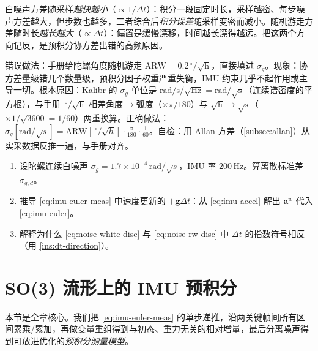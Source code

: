 \begin{insight}\label{ins:dt-direction}
白噪声方差随采样\emph{越快越小}（$\propto1/\Delta t$）：积分一段固定时长，采样越密、每步噪声方差越大，但步数也越多，二者综合后\emph{积分误差}随采样变密而减小。随机游走方差随时长\emph{越长越大}（$\propto\Delta t$）：偏置是缓慢漂移，时间越长漂得越远。把这两个方向记反，是预积分协方差出错的高频原因。
\end{insight}

\begin{pitfall}
错误做法：手册给陀螺角度随机游走 $\mathrm{ARW}=0.2\,^\circ/\sqrt{\mathrm h}$，直接填进 $\sigma_g$。现象：协方差量级错几个数量级，预积分因子权重严重失衡，IMU 约束几乎不起作用或主导一切。根本原因：Kalibr 的 $\sigma_g$ 单位是 $\mathrm{rad}/\mathrm s/\sqrt{\mathrm{Hz}}=\mathrm{rad}/\sqrt{\mathrm s}$（连续谱密度的平方根），与手册 $\,^\circ/\sqrt{\mathrm h}$ 相差角度$\to$弧度（$\times\pi/180$）与 $\sqrt{\mathrm h}\to\sqrt{\mathrm s}$（$\times1/\sqrt{3600}=1/60$）两重换算。正确做法：$\sigma_g[\mathrm{rad}/\sqrt s]=\mathrm{ARW}[\,^\circ/\sqrt h]\cdot\frac{\pi}{180}\cdot\frac{1}{60}$。自检：用 Allan 方差（\cref{subsec:allan}）从实采数据反推一遍，与手册对齐。
\end{pitfall}

\begin{practice}
\begin{enumerate}
  \item 设陀螺连续白噪声 $\sigma_g=1.7\times10^{-4}\,\mathrm{rad}/\sqrt s$，IMU 率 $200\,\mathrm{Hz}$。算离散标准差 $\sigma_{g,d}$。
  \item 推导 \cref{eq:imu-euler-meas} 中速度更新的 $+\mathbf g\Delta t$：从 \cref{eq:imu-accel} 解出 $\mathbf a^w$ 代入 \cref{eq:imu-euler}。
  \item 解释为什么 \cref{eq:noise-white-disc} 与 \cref{eq:noise-rw-disc} 中 $\Delta t$ 的指数符号相反（用 \cref{ins:dt-direction}）。
\end{enumerate}
\end{practice}

\section{SO(3) 流形上的 IMU 预积分}
\label{sec:imu-preint}

本节是全章核心。我们把 \cref{eq:imu-euler-meas} 的单步递推，沿两关键帧间所有区间累乘/累加，再做变量重组得到与初态、重力无关的相对增量，最后分离噪声得到可放进优化的\emph{预积分测量模型}。

